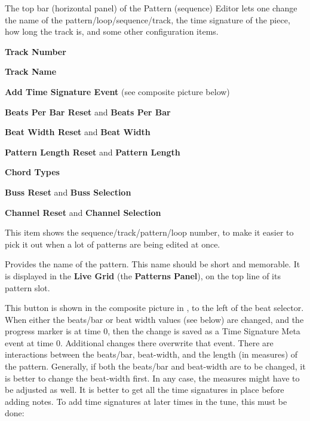    The top bar (horizontal panel) of the Pattern (sequence) Editor
   lets one change the name of
   the pattern/loop/sequence/track, the time signature of the piece, how long
   the track is, and some other configuration items.

   \begin{enumber}
      \item \textbf{Track Number}
      \item \textbf{Track Name}
      \item \textbf{Add Time Signature Event} (see composite picture below)
      \item \textbf{Beats Per Bar Reset} and \textbf{Beats Per Bar}
      \item \textbf{Beat Width Reset} and \textbf{Beat Width}
      \item \textbf{Pattern Length Reset} and \textbf{Pattern Length}
      \item \textbf{Chord Types}
      \item \textbf{Buss Reset} and \textbf{Buss Selection}
      \item \textbf{Channel Reset} and \textbf{Channel Selection}
   \end{enumber}

   \setcounter{ItemCounter}{0}      %

   This item shows the sequence/track/pattern/loop
   number, to make it easier to pick it out when a lot of patterns are being
   edited at once.

   Provides the name of the pattern.
   This name should be short and memorable.
   It is displayed in the \textbf{Live Grid} (the \textbf{Patterns Panel}),
   on the top line of its pattern slot.

   This button is shown in the composite picture in
   , to the left of the beat
   selector.
   When either the beats/bar or beat width values (see below) are changed,
   and the progress marker is at time 0, then the change is
   saved as a Time Signature Meta event at time 0. Additional changes there
   overwrite that event.
   There are interactions between the beats/bar, beat-width, and the length (in
   measures) of the pattern.
   Generally, if both the beats/bar and beat-width are to be changed,
   it is better to change the beat-width first.
   In any case, the measures might have to be adjusted as well.
   It is better to get all the time signatures in place before adding notes.
   To add time signatures at later times in the tune, this must be done:


